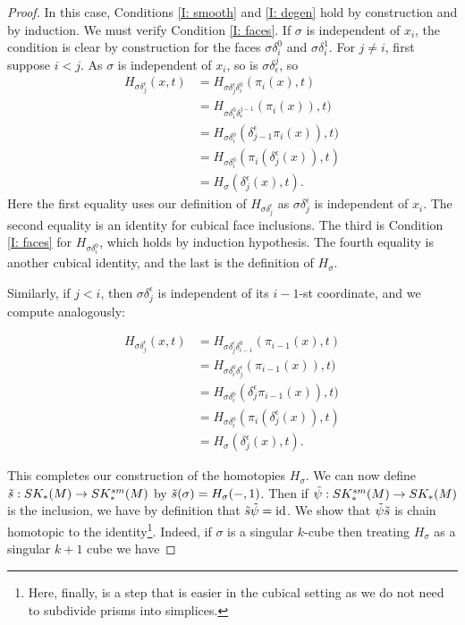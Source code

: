 \begin{proof}
	In this case, Conditions \eqref{I: smooth} and \eqref{I: degen} hold by construction and by induction. We must verify Condition \eqref{I: faces}. If $\sigma$ is independent of $x_i$, the condition is clear by construction for the faces $\sigma\delta_i^0$ and $\sigma\delta_i^1$. For $j\neq i$, first suppose $i<j$. As $\sigma$ is independent of $x_i$, so is $\sigma\delta^j_\epsilon$, so
	\begin{align*}
		H_{\sigma\delta_j^\epsilon}(x,t)& = H_{\sigma\delta_j^\epsilon \delta_i^0}(\pi_i(x),t)\\
		& = H_{\sigma \delta_i^0\delta^{j-1}_\epsilon}(\pi_i(x)),t)\\
		& = H_{\sigma \delta_i^0}(\delta_{j-1}^\epsilon\pi_i(x)),t)\\
		& = H_{\sigma \delta_i^0}(\pi_i(\delta_j^\epsilon(x)),t)\\
		& = H_\sigma(\delta_j^\epsilon(x),t).
	\end{align*}
	Here the first equality uses our definition of $H_{\sigma\delta_j^\epsilon}$ as $\sigma\delta_j^\epsilon$ is independent of $x_i$. The second equality is an identity for cubical face inclusions. The third is Condition \eqref{I: faces} for $H_{\sigma \delta_i^0}$, which holds by induction hypothesis. The fourth equality is another cubical identity, and the last is the definition of $H_\sigma$.

	Similarly, if $j<i$, then $\sigma\delta_j^\epsilon$ is independent of its $i-1$-st coordinate, and we compute analogously:

	\begin{align*}
		H_{\sigma\delta_j^\epsilon}(x,t)& = H_{\sigma\delta_j^\epsilon \delta_{i-1}^0}(\pi_{i-1}(x),t)\\
		& = H_{\sigma \delta_{i}^0\delta_{j}^\epsilon}(\pi_{i-1}(x)),t)\\
		& = H_{\sigma \delta_{i}^0}(\delta_{j}^\epsilon\pi_{i-1}(x)),t)\\
		& = H_{\sigma \delta_{i}^0}(\pi_{i}(\delta_j^\epsilon(x)),t)\\
		& = H_\sigma(\delta_j^\epsilon(x),t).
	\end{align*}

	This completes our construction of the homotopies $H_\sigma$. We can now define $\tilde s:SK_*(M) \to SK^{sm}_*(M)$ by $\tilde s(\sigma) = H_\sigma(-,1)$. Then if $\tilde \psi: SK_*^{sm}(M) \to SK_*(M)$ is the inclusion, we have by definition that $\tilde s \tilde \psi = \mathrm{id}$. We show that $\tilde\psi\tilde s$ is chain homotopic to the identity\footnote{Here, finally, is a step that is easier in the cubical setting as we do not need to subdivide prisms into simplices.}. Indeed, if $\sigma$ is a singular $k$-cube then treating $H_\sigma$ as a singular $k+1$ cube we have


\end{proof}

